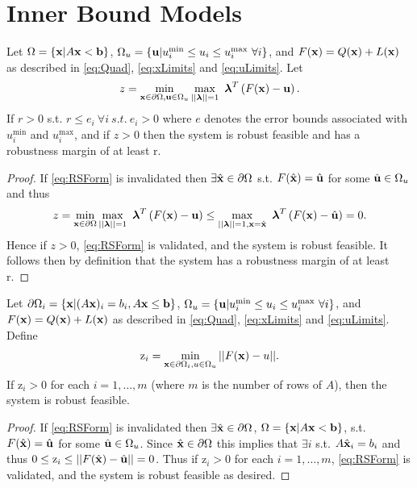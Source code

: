 \section{Inner Bound Models} \label{sec:inbdform}  

\begin{thm}
Let $\Omega=\{\mathbf{x}| A\mathbf{x}< \mathbf{b}\}$, $\Omega_{u}=\{\mathbf{u}| u^{\min}_i\leq u_i \leq u^{\max}_i \ \forall i \}$, and $F(\mathbf{x})=Q(\mathbf{x})+L(\mathbf{x})$ as described in \cref{eq:Quad}, \cref{eq:xLimits} and \cref{eq:uLimits}. 
Let
$$z = \min\limits_{\vx\in \partial \Omega, \vu\in \Omega_{u} }\max\limits_{||\boldsymbol{\lambda}||=1}\ \boldsymbol{\lambda}^T\left(F(\vx)-\vu\right).$$
If $r>0$ s.t. $r\leq e_i \ \forall i \ s.t. \ e_i>0$ where $e$ denotes the error bounds associated with $ u^{\min}_i$ and $ u^{\max}_i$, and if $z>0$ then the system is robust feasible and has a robustness margin of at least r.

\begin{proof} 
If \cref{eq:RSForm} is invalidated then $\exists \hat{\mathbf{x}}\in\partial\Omega$ s.t. $F(\hat{\mathbf{x}})=\hat{\mathbf{u}}$ for some $\hat{\mathbf{u}}\in\Omega_{u}$ and thus $$z = \min\limits_{\vx\in \partial \Omega}\max\limits_{||\boldsymbol{\lambda}||=1}\ \boldsymbol{\lambda}^T\left(F(\vx)-\vu\right)\leq \max\limits_{||\boldsymbol{\lambda}||=1, \vx=\hat{\vx}}\ \boldsymbol{\lambda}^T\left(F(\vx)-\hat{\vu}\right)=0.$$ 
Hence if $z>0$, \cref{eq:RSForm} is validated, and the system is robust feasible. It follows then by definition that the system has a robustness margin of at least r.
\end{proof}
\end{thm}

\begin{thm} \label{thm:RobFeas}
Let $\partial\Omega_i=\{\mathbf{x}| (A\mathbf{x})_i = b_i, A\mathbf{x}\leq \mathbf{b}\}$, $\Omega_{u}=\{\mathbf{u}| u^{\min}_i\leq u_i \leq u^{\max}_i \ \forall i \}$, and $F(\mathbf{x})=Q(\mathbf{x})+L(\mathbf{x})$ as described in \cref{eq:Quad}, \cref{eq:xLimits} and \cref{eq:uLimits}. Define
\begin{align}
\mathrm{z}_i =  \min_{\mathbf{x}\in\partial\Omega_i, u\in \Omega_u} ||F(\mathbf{x})-u||. \label{eq:OPTfeas}
\end{align}
If $\mathrm{z}_i>0$ for each $i = 1, \ldots, m$ (where $m$ is the number of rows of $A$), then the system is robust feasible.

\begin{proof} 
If \cref{eq:RSForm} is invalidated then $\exists \hat{\mathbf{x}}\in\partial\Omega$, $\Omega=\{\mathbf{x}| A\mathbf{x}< \mathbf{b}\}$, s.t. $F(\hat{\mathbf{x}})=\hat{\mathbf{u}}$ for some $\hat{\mathbf{u}}\in \Omega_u$. 
Since $\hat{\mathbf{x}}\in\partial\Omega$ this implies that $\exists i$ s.t. $A\hat{\mathbf{x}}_i=b_i$ and thus $0\leq \mathrm{z}_i \leq ||F(\hat{\mathbf{x}})-\hat{\mathbf{u}}||=0$.
Thus if $\mathrm{z}_i>0$ for each $i = 1, \ldots, m$, \cref{eq:RSForm} is validated, and the system is robust feasible as desired.
\end{proof}
\end{thm}

